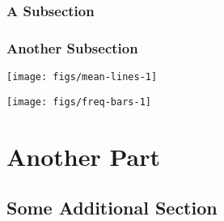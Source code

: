 \documentclass[
    numbers=noenddot,
    open=any,
    paper=a4,
    oneside,
    pagesize,
    captions=tableheading,
    bibliography=totoc,
    11pt
    ]{scrbook}
\begin{document}
\hypertarget{a-subsection}{%
\section{A Subsection}\label{a-subsection}}

\hypertarget{another-subsection}{%
\section{Another Subsection}\label{another-subsection}}

\begin{center}\texttt{[image: figs/mean-lines-1]} \end{center}

\begin{center}\texttt{[image: figs/freq-bars-1]} \end{center}

\hypertarget{another-part}{%
\part{Another Part}\label{another-part}}

\hypertarget{some-additional-section}{%
\chapter{Some Additional Section}\label{some-additional-section}}

\textcite{tarski1944semantic}

\textcite{dayal2009variation}

    \printbibliography[heading=bibintoc]
\end{document}
